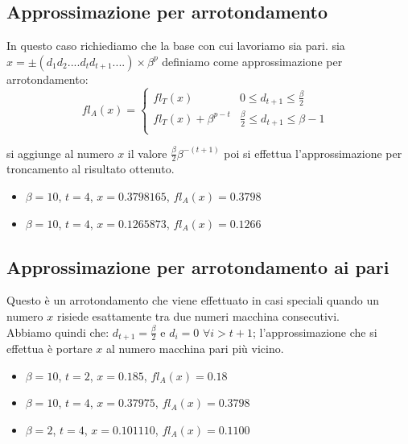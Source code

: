 \documentclass[12pt, a4paper]{book}
\theoremstyle{definition}
\begin{document}
\subsection{Approssimazione per arrotondamento}
\begin{flushleft}
In questo caso richiediamo che la base con cui lavoriamo sia pari.
sia $x = \pm(d_{1}d_{2}....d_{t}d_{t+1}....)\times \beta^{p}$ definiamo come approssimazione per arrotondamento:
\[
fl_{A}(x) = 
\begin{cases}
  fl_{T}(x) & \text{$0 \leq d_{t+1} \leq \frac{\beta}{2}$ } \\
  fl_{T}(x) + \beta^{p-t} & \text{$\frac{\beta}{2} \leq d_{t+1} \leq \beta - 1$ } \\
\end{cases}
\]

si aggiunge al numero $x$ il valore $\frac{\beta}{2}\beta^{-(t+1)}$ poi si effettua l'approssimazione per troncamento al risultato ottenuto.
\end{flushleft}

\begin{itemize}
  	\item $\beta = 10$,  $t=4$,  $x = 0.3798165$,  $fl_{A}(x) =  0.3798$
  	\item $\beta = 10$,  $t=4$,  $x = 0.1265873$,  $fl_{A}(x) =  0.1266$
\end{itemize}

\subsection{Approssimazione per arrotondamento ai pari}
\begin{flushleft}
Questo è un arrotondamento che viene effettuato in casi speciali quando un numero $x$ risiede esattamente tra due numeri macchina consecutivi.\\
Abbiamo quindi che: $d_{t+1} = \frac{\beta}{2}$ e $d_{i} = 0$ $\forall i > t + 1$; l'approssimazione che si effettua è portare $x$ al numero macchina pari più vicino.  

\begin{itemize}
  	\item $\beta = 10$,  $t=2$,  $x = 0.185 $,  $fl_{A}(x) =  0.18$
  	\item $\beta = 10$,  $t=4$,  $x = 0.37975 $,  $fl_{A}(x) =  0.3798$
  	\item $\beta = 2$,  $t=4$,  $x = 0.101110$,  $fl_{A}(x) =  0.1100$
\end{itemize}
\end{flushleft}
\newpage
\end{document}
